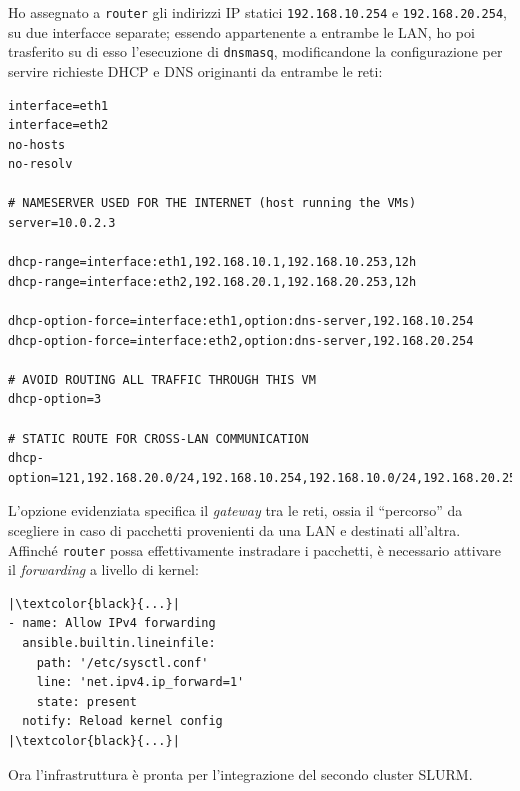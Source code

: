 \documentclass[12pt,a4paper,twoside,openright]{book}
\begin{document}
Ho assegnato a \texttt{router} gli indirizzi \ac{IP} statici \texttt{192.168.10.254} e \texttt{192.168.20.254}, su due interfacce separate; essendo appartenente a entrambe le \ac{LAN}, ho poi trasferito su di esso l'esecuzione di \texttt{dnsmasq}, modificandone la configurazione per servire richieste \ac{DHCP} e \ac{DNS} originanti da entrambe le reti:
\begin{verbatim}
interface=eth1
interface=eth2
no-hosts
no-resolv

# NAMESERVER USED FOR THE INTERNET (host running the VMs)
server=10.0.2.3

dhcp-range=interface:eth1,192.168.10.1,192.168.10.253,12h
dhcp-range=interface:eth2,192.168.20.1,192.168.20.253,12h

dhcp-option-force=interface:eth1,option:dns-server,192.168.10.254
dhcp-option-force=interface:eth2,option:dns-server,192.168.20.254

# AVOID ROUTING ALL TRAFFIC THROUGH THIS VM
dhcp-option=3

# STATIC ROUTE FOR CROSS-LAN COMMUNICATION
dhcp-option=121,192.168.20.0/24,192.168.10.254,192.168.10.0/24,192.168.20.254
\end{verbatim}
L'opzione evidenziata specifica il \textit{gateway} tra le reti, ossia il ``percorso'' da scegliere in caso di pacchetti provenienti da una \ac{LAN} e destinati all'altra. Affinché \texttt{router} possa effettivamente instradare i pacchetti, è necessario attivare il \textit{forwarding} a livello di kernel:
\begin{verbatim}
|\textcolor{black}{...}|
- name: Allow IPv4 forwarding
  ansible.builtin.lineinfile:
    path: '/etc/sysctl.conf'
    line: 'net.ipv4.ip_forward=1'
    state: present
  notify: Reload kernel config
|\textcolor{black}{...}|
\end{verbatim}
Ora l'infrastruttura è pronta per l'integrazione del secondo cluster \ac{SLURM}.
\end{document}
